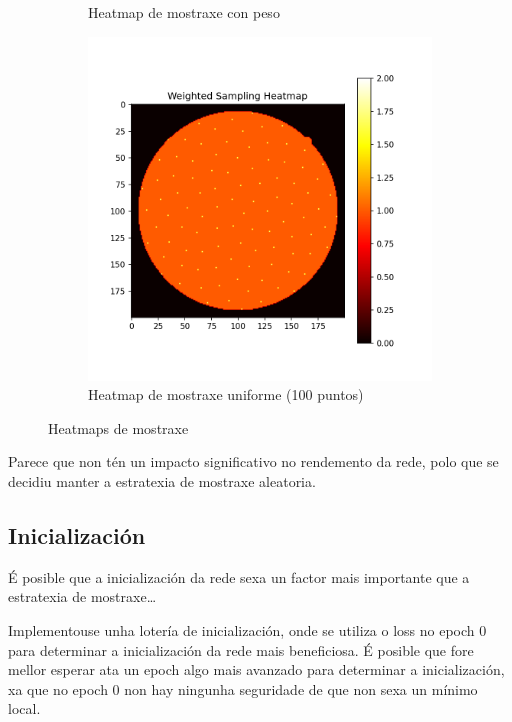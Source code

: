 \begin{figure}[]
\begin{subfigure}[b]{0.3\textwidth}
        \caption{Heatmap de mostraxe con peso}
        \label{fig:weighted_sampling_heatmap}
    \end{subfigure}
    \hfill
    \begin{subfigure}[b]{0.3\textwidth}
        \centering
        \includegraphics[width=\textwidth]{imaxes/uniform_sampling_heatmap.png}
        \caption{Heatmap de mostraxe uniforme (100 puntos)}
        \label{fig:uniform_sampling_heatmap}
    \end{subfigure}
    \caption{Heatmaps de mostraxe}
    \label{fig:sampling_heatmaps}
\end{figure}


Parece que non tén un impacto significativo no rendemento da rede, polo que se decidiu manter a estratexia de mostraxe aleatoria.

\subsection{Inicialización}
\label{subsec:Inicialización}

É posible que a inicialización da rede sexa un factor mais importante que a estratexia de mostraxe\dots

Implementouse unha lotería de inicialización, onde se utiliza o loss no epoch 0 para determinar a inicialización da rede mais beneficiosa.
É posible que fore mellor esperar ata un epoch algo mais avanzado para determinar a inicialización, xa que no epoch 0 non hay ningunha seguridade de que non sexa un mínimo local.